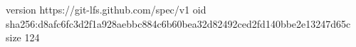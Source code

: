 version https://git-lfs.github.com/spec/v1
oid sha256:d8afc6fc3d2f1a928aebbc884c6b60bea32d82492ced2fd140bbe2e13247d65c
size 124
